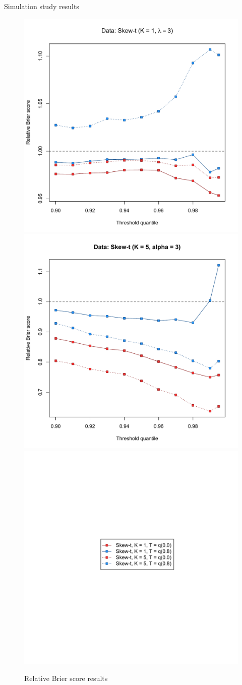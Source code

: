 \documentclass{beamer}
\begin{document}
\begin{frame}{Simulation study results}
\centering
  \begin{figure}
    \includegraphics[width=0.45\linewidth]{./plots/pot/bs-sim-st1.pdf}
    \includegraphics[width=0.45\linewidth]{./plots/pot/bs-sim-st5.pdf} \\
    \includegraphics[width=0.3\linewidth, trim=2in 3.25in 2in 3in]{./plots/pot/bs-sim-legend.pdf}
    \caption{Relative Brier score results}
  \end{figure}
\end{frame}
\end{document}
